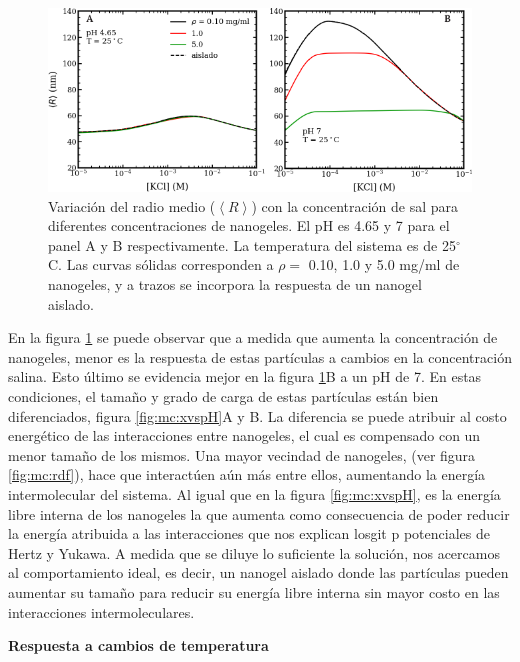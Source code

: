 	\begin{figure}
		\centering
		\includegraphics[width=0.99\linewidth]{Figures/graph-mc/r-salts-pHs.pdf}
		\caption{Variaci\'on del radio medio ($\left<R\right>$) con la concentraci\'on de sal para diferentes concentraciones de nanogeles. El pH es 4.65 y 7 para el panel A y B respectivamente. La temperatura del sistema es de 25$^\circ$C. Las curvas s\'olidas corresponden a $\rho=$ 0.10, 1.0 y 5.0 mg/ml de nanogeles, y a trazos se incorpora la respuesta de un nanogel aislado.}
		\label{fig:mc:reentrante}
	\end{figure}
	
En la figura \ref{fig:mc:reentrante} se puede observar que a medida que aumenta la concentraci\'on de nanogeles, menor es la respuesta de estas part\'iculas a cambios en la concentraci\'on salina. Esto \'ultimo se evidencia mejor en la figura \ref{fig:mc:reentrante}B a un pH de 7. En estas condiciones, el tama\~no y grado de carga de estas part\'iculas est\'an bien diferenciados, figura \ref{fig:mc:xvspH}A y B. La diferencia se puede atribuir al costo energ\'etico de las interacciones entre nanogeles, el cual es compensado con un menor tama\~no de los mismos. Una mayor vecindad de nanogeles, (ver figura \ref{fig:mc:rdf}), hace que interact\'uen a\'un m\'as entre ellos, aumentando la energ\'ia intermolecular del sistema. Al igual que en la figura \ref{fig:mc:xvspH}, es la energ\'ia libre interna de los nanogeles la que aumenta como consecuencia de poder reducir la energ\'ia atribuida a las interacciones que nos explican losgit p potenciales de Hertz y Yukawa. A medida que se diluye lo suficiente la soluci\'on, nos acercamos al comportamiento ideal, es decir, un nanogel aislado donde las part\'iculas pueden aumentar su tama\~no para reducir su energ\'ia libre interna sin mayor costo en las interacciones intermoleculares.
	
	
	\textbf{Respuesta a cambios de temperatura}

